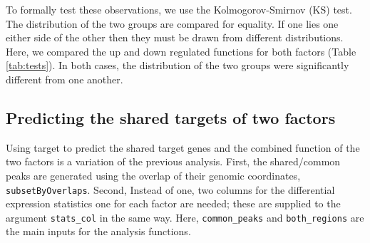 \documentclass[9pt,a4paper,]{extarticle}
\newenvironment{Shaded}{\begin{snugshade}}{\end{snugshade}}
\newcommand{\CommentTok}[1]{\textcolor[rgb]{0.56,0.35,0.01}{\textit{#1}}}
\newcommand{\DataTypeTok}[1]{\textcolor[rgb]{0.13,0.29,0.53}{#1}}
\newcommand{\DecValTok}[1]{\textcolor[rgb]{0.00,0.00,0.81}{#1}}
\newcommand{\KeywordTok}[1]{\textcolor[rgb]{0.13,0.29,0.53}{\textbf{#1}}}
\newcommand{\NormalTok}[1]{#1}
\newcommand{\OperatorTok}[1]{\textcolor[rgb]{0.81,0.36,0.00}{\textbf{#1}}}
\newcommand{\OtherTok}[1]{\textcolor[rgb]{0.56,0.35,0.01}{#1}}
\newcommand{\StringTok}[1]{\textcolor[rgb]{0.31,0.60,0.02}{#1}}
\begin{document}
To formally test these observations, we use the Kolmogorov-Smirnov (KS) test. The distribution of the two groups are compared for equality. If one lies one either side of the other then they must be drawn from different distributions. Here, we compared the up and down regulated functions for both factors (Table \ref{tab:tests}). In both cases, the distribution of the two groups were significantly different from one another.

\hypertarget{predicting-the-shared-targets-of-two-factors}{%
\subsection{Predicting the shared targets of two factors}\label{predicting-the-shared-targets-of-two-factors}}

Using target to predict the shared target genes and the combined function of the two factors is a variation of the previous analysis. First, the shared/common peaks are generated using the overlap of their genomic coordinates, \texttt{subsetByOverlaps}. Second, Instead of one, two columns for the differential expression statistics one for each factor are needed; these are supplied to the argument \texttt{stats\_col} in the same way. Here, \texttt{common\_peaks} and \texttt{both\_regions} are the main inputs for the analysis functions.

\begin{Shaded}
\end{Shaded}

\begin{Shaded}
\end{Shaded}
\end{document}

